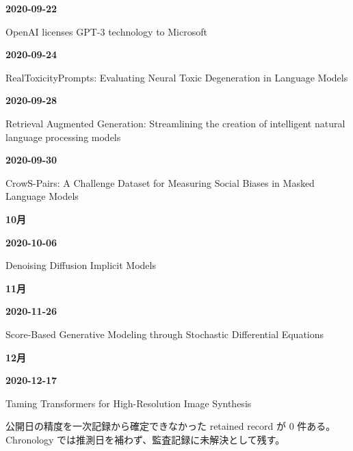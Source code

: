 \smallskip
\noindent\textbf{2020-09-22}\par
{\raggedright OpenAI licenses GPT-3 technology to Microsoft\,\cite{chron-d1937720d23b}\par}
\smallskip
\noindent\textbf{2020-09-24}\par
{\raggedright RealToxicityPrompts: Evaluating Neural Toxic Degeneration in Language Models\,\cite{src-308178e74f55}\par}
\smallskip
\noindent\textbf{2020-09-28}\par
{\raggedright Retrieval Augmented Generation: Streamlining the creation of intelligent natural language processing models\,\cite{src-c441b6f2b8f4}\par}
\smallskip
\noindent\textbf{2020-09-30}\par
{\raggedright CrowS-Pairs: A Challenge Dataset for Measuring Social Biases in Masked Language Models\,\cite{chron-26b56fdd8762}\par}
\smallskip
\medskip
\noindent\textbf{10月}\par
\smallskip
\noindent\textbf{2020-10-06}\par
{\raggedright Denoising Diffusion Implicit Models\,\cite{chron-3795c498d964}\par}
\smallskip
\medskip
\noindent\textbf{11月}\par
\smallskip
\noindent\textbf{2020-11-26}\par
{\raggedright Score-Based Generative Modeling through Stochastic Differential Equations\,\cite{src-c012a248ff78}\par}
\smallskip
\medskip
\noindent\textbf{12月}\par
\smallskip
\noindent\textbf{2020-12-17}\par
{\raggedright Taming Transformers for High-Resolution Image Synthesis\,\cite{src-03b656c5d291}\par}
\smallskip
\medskip
\begin{claimboundary}[日付精度の境界]
公開日の精度を一次記録から確定できなかった retained record が 0 件ある。Chronology では推測日を補わず、監査記録に未解決として残す。
\end{claimboundary}
